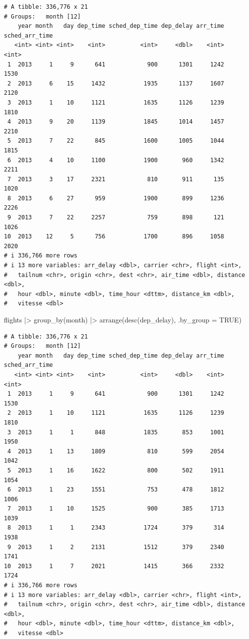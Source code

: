 \documentclass[
  letterpaper,
  DIV=11,
  numbers=noendperiod,
  oneside]{scrreprt}
\newenvironment{Shaded}{\begin{snugshade}}{\end{snugshade}}
\newcommand{\AttributeTok}[1]{\textcolor[rgb]{0.40,0.45,0.13}{#1}}
\newcommand{\ConstantTok}[1]{\textcolor[rgb]{0.56,0.35,0.01}{#1}}
\newcommand{\FunctionTok}[1]{\textcolor[rgb]{0.28,0.35,0.67}{#1}}
\newcommand{\NormalTok}[1]{\textcolor[rgb]{0.00,0.23,0.31}{#1}}
\newcommand{\SpecialCharTok}[1]{\textcolor[rgb]{0.37,0.37,0.37}{#1}}
\begin{document}
\begin{verbatim}
# A tibble: 336,776 x 21
# Groups:   month [12]
    year month   day dep_time sched_dep_time dep_delay arr_time sched_arr_time
   <int> <int> <int>    <int>          <int>     <dbl>    <int>          <int>
 1  2013     1     9      641            900      1301     1242           1530
 2  2013     6    15     1432           1935      1137     1607           2120
 3  2013     1    10     1121           1635      1126     1239           1810
 4  2013     9    20     1139           1845      1014     1457           2210
 5  2013     7    22      845           1600      1005     1044           1815
 6  2013     4    10     1100           1900       960     1342           2211
 7  2013     3    17     2321            810       911      135           1020
 8  2013     6    27      959           1900       899     1236           2226
 9  2013     7    22     2257            759       898      121           1026
10  2013    12     5      756           1700       896     1058           2020
# i 336,766 more rows
# i 13 more variables: arr_delay <dbl>, carrier <chr>, flight <int>,
#   tailnum <chr>, origin <chr>, dest <chr>, air_time <dbl>, distance <dbl>,
#   hour <dbl>, minute <dbl>, time_hour <dttm>, distance_km <dbl>,
#   vitesse <dbl>
\end{verbatim}

\begin{Shaded}
\begin{Highlighting}[]
\NormalTok{flights }\SpecialCharTok{|\textgreater{}} 
  \FunctionTok{group\_by}\NormalTok{(month) }\SpecialCharTok{|\textgreater{}} 
  \FunctionTok{arrange}\NormalTok{(}\FunctionTok{desc}\NormalTok{(dep\_delay), }\AttributeTok{.by\_group =} \ConstantTok{TRUE}\NormalTok{)}
\end{Highlighting}
\end{Shaded}

\begin{verbatim}
# A tibble: 336,776 x 21
# Groups:   month [12]
    year month   day dep_time sched_dep_time dep_delay arr_time sched_arr_time
   <int> <int> <int>    <int>          <int>     <dbl>    <int>          <int>
 1  2013     1     9      641            900      1301     1242           1530
 2  2013     1    10     1121           1635      1126     1239           1810
 3  2013     1     1      848           1835       853     1001           1950
 4  2013     1    13     1809            810       599     2054           1042
 5  2013     1    16     1622            800       502     1911           1054
 6  2013     1    23     1551            753       478     1812           1006
 7  2013     1    10     1525            900       385     1713           1039
 8  2013     1     1     2343           1724       379      314           1938
 9  2013     1     2     2131           1512       379     2340           1741
10  2013     1     7     2021           1415       366     2332           1724
# i 336,766 more rows
# i 13 more variables: arr_delay <dbl>, carrier <chr>, flight <int>,
#   tailnum <chr>, origin <chr>, dest <chr>, air_time <dbl>, distance <dbl>,
#   hour <dbl>, minute <dbl>, time_hour <dttm>, distance_km <dbl>,
#   vitesse <dbl>
\end{verbatim}
\end{document}
